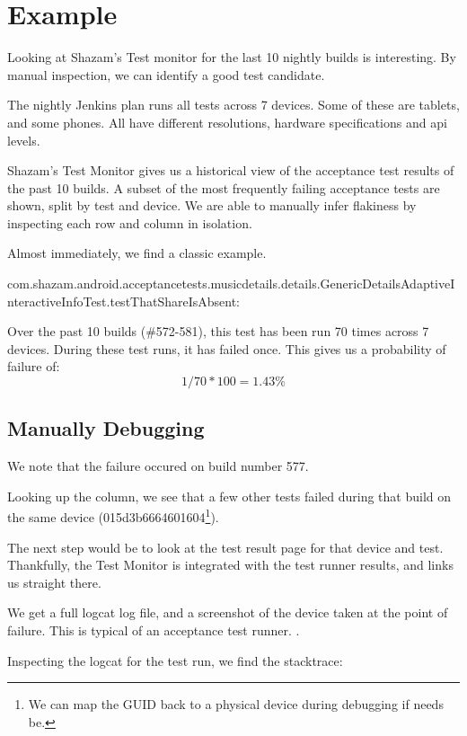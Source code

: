 \section{Example}
\label{sec:example}


Looking at Shazam's \Flaky Test monitor for the last 10 nightly builds is
interesting. By manual inspection, we can identify a good \flaky test candidate.

The nightly Jenkins plan runs all tests across 7 devices. Some of these are
tablets, and some phones. All have different resolutions, hardware
specifications and api levels.

Shazam's \Flaky Test Monitor gives us a historical view of the acceptance test
results of the past 10 builds. A subset of the most frequently failing
acceptance tests are shown, split by test and device. We are able to manually
infer flakiness by inspecting each row and column in isolation.

Almost immediately, we find a classic example.

com.shazam.android.acceptancetests.musicdetails.details.GenericDetailsAdaptiveInteractiveInfoTest.testThatShareIsAbsent:

Over the past 10 builds (\#572-581), this test has been run 70 times across 7
devices. During these test runs, it has failed once. This gives us a probability
of failure of:
$$ 1 / 70 * 100 = 1.43\% $$

\subsection{Manually Debugging}

We note that the failure occured on build number 577.

Looking up the column, we see that a few other tests failed during that build on
the same device (015d3b6664601604\footnote{We can map the GUID back to a
physical device during debugging if needs be.}).

The next step would be to look at the test result page for that device and test.
Thankfully, the \Flaky Test Monitor is integrated with the test runner results,
and links us straight there.

We get a full logcat log file, and a screenshot of the device taken at the point
of failure. This is typical of an acceptance test runner. .

Inspecting the logcat  for the test run, we find the
stacktrace:

